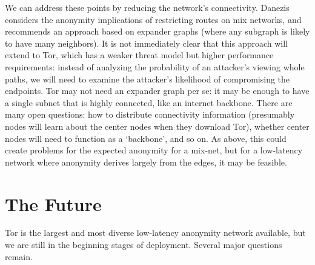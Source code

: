 \documentclass{llncs}
\begin{document}
We can address these points by reducing the network's connectivity.
Danezis~\cite{danezis-pets03} considers
the anonymity implications of restricting routes on mix networks, and
recommends an approach based on expander graphs (where any subgraph is likely
to have many neighbors).  It is not immediately clear that this approach will
extend to Tor, which has a weaker threat model but higher performance
requirements: instead of analyzing the
probability of an attacker's viewing whole paths, we will need to examine the
attacker's likelihood of compromising the endpoints.
%
Tor may not need an expander graph per se: it
may be enough to have a single subnet that is highly connected, like
an internet backbone. %
There are many open questions: how to distribute connectivity information
(presumably nodes will learn about the center nodes
when they download Tor), whether center nodes
will need to function as a `backbone', and so on. As above,
this could create problems for the expected anonymity for a mix-net,
but for a low-latency network where anonymity derives largely from
the edges, it may be feasible.


\section{The Future}
\label{sec:conclusion}

Tor is the largest and most diverse low-latency anonymity network
available, but we are still in the beginning stages of deployment. Several
major questions remain.
\end{document}
